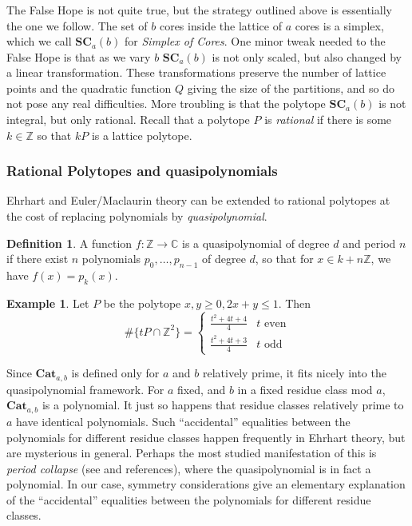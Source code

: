 \documentclass{amsart}[12pt]
\theoremstyle{definition}
\newtheorem{example}[dummy]{Example}
\newtheorem{definition}[dummy]{Definition}
\newcommand{\Z}{\mathbb{Z}}
\newcommand{\C}{\mathbb{C}}
\newcommand{\SC}{\mathbf{SC}}
\newcommand{\Cat}{\mathbf{Cat}}
\begin{document}
\subsubsection{}
The False Hope is not quite true, but the strategy outlined above is essentially the one we follow. The set of $b$ cores inside the lattice of $a$ cores is a simplex, which we call $\SC_a(b)$ for \emph{Simplex of Cores}.
One minor tweak needed to the False Hope is that as we vary $b$ $\SC_a(b)$ is not only scaled, but also changed by a linear transformation. These transformations preserve the number of lattice points and the quadratic function $Q$ giving the size of the partitions, and so do not pose any real difficulties.
More troubling is that the polytope $\SC_{a}(b)$ is not integral, but only rational. Recall that a polytope $P$ is \emph{rational} if there is some $k\in\Z$ so that $kP$ is a lattice polytope.



\subsubsection{Rational Polytopes and quasipolynomials}
Ehrhart and Euler/Maclaurin theory can be extended to rational polytopes at the cost of replacing polynomials by \emph{quasipolynomial}.


\begin{definition}
A function $f:\Z\to\C$ is a quasipolynomial of degree $d$ and period $n$ if there exist $n$ polynomials $p_0,\dots, p_{n-1}$ of degree $d$, so that for $x\in k+n\Z$, we have $f(x)=p_k(x)$.
\end{definition}

\begin{example} Let $P$ be the polytope $x, y\geq 0, 2x+y\leq 1$. Then
$$\#\{tP\cap \Z^2\}=\left\{\begin{array}{rl} \frac{t^2+4t+4}{4} & \text{$t$ even} \\
\frac{t^2+4t+3}{4} & \text{$t$ odd}\end{array}\right.$$
\end{example}


Since $\Cat_{a,b}$ is defined only for $a$ and $b$ relatively prime, it fits nicely into the quasipolynomial framework. For $a$ fixed, and $b$ in a fixed residue class mod $a$, $\Cat_{a,b}$ is a polynomial. It just so happens that residue classes relatively prime to $a$ have identical polynomials. Such ``accidental'' equalities between the polynomials for different residue classes happen frequently in Ehrhart theory, but are mysterious in general. Perhaps the most studied manifestation of this is \emph{period collapse} (see \cite{Haase} and references), where the quasipolynomial is in fact a polynomial. In our case, symmetry considerations give an elementary explanation of the ``accidental'' equalities between the polynomials for different residue classes.
\end{document}
